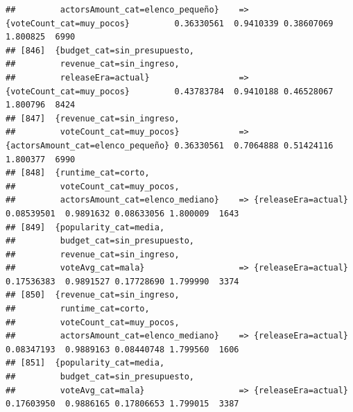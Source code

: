 \documentclass[
]{article}
\begin{document}
\begin{verbatim}
##         actorsAmount_cat=elenco_pequeño}    => {voteCount_cat=muy_pocos}         0.36330561  0.9410339 0.38607069 1.800825  6990
## [846]  {budget_cat=sin_presupuesto,                                                                                             
##         revenue_cat=sin_ingreso,                                                                                                
##         releaseEra=actual}                  => {voteCount_cat=muy_pocos}         0.43783784  0.9410188 0.46528067 1.800796  8424
## [847]  {revenue_cat=sin_ingreso,                                                                                                
##         voteCount_cat=muy_pocos}            => {actorsAmount_cat=elenco_pequeño} 0.36330561  0.7064888 0.51424116 1.800377  6990
## [848]  {runtime_cat=corto,                                                                                                      
##         voteCount_cat=muy_pocos,                                                                                                
##         actorsAmount_cat=elenco_mediano}    => {releaseEra=actual}               0.08539501  0.9891632 0.08633056 1.800009  1643
## [849]  {popularity_cat=media,                                                                                                   
##         budget_cat=sin_presupuesto,                                                                                             
##         revenue_cat=sin_ingreso,                                                                                                
##         voteAvg_cat=mala}                   => {releaseEra=actual}               0.17536383  0.9891527 0.17728690 1.799990  3374
## [850]  {revenue_cat=sin_ingreso,                                                                                                
##         runtime_cat=corto,                                                                                                      
##         voteCount_cat=muy_pocos,                                                                                                
##         actorsAmount_cat=elenco_mediano}    => {releaseEra=actual}               0.08347193  0.9889163 0.08440748 1.799560  1606
## [851]  {popularity_cat=media,                                                                                                   
##         budget_cat=sin_presupuesto,                                                                                             
##         voteAvg_cat=mala}                   => {releaseEra=actual}               0.17603950  0.9886165 0.17806653 1.799015  3387

\end{verbatim}
\end{document}
